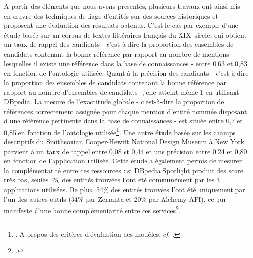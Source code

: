\documentclass[a4paper,12pt,twoside]{book}
\begin{document}
	A partir des éléments que nous avons présentés, plusieurs travaux ont ainsi mis en œuvre des techniques de liage d'entités sur des sources historiques et proposent une évaluation des résultats obtenus. C'est le cas par exemple d'une étude basée sur un corpus de textes littéraires français du XIX\ieme\ siècle, qui obtient un taux de rappel des candidats - c'est-à-dire la proportion des ensembles de candidats contenant la bonne référence par rapport au nombre de mentions lesquelles il existe une référence dans la base de connaissances - entre 0,63 et 0,83 en fonction de l'ontologie utilisée. Quant à la précision des candidats - c'est-à-dire la proportion des ensembles de candidats contenant la bonne référence par rapport au nombre d'ensembles de candidats -, elle atteint même 1 en utilisant DBpedia. La mesure de l'exactitude globale - c'est-à-dire la proportion de références correctement assignée pour chaque mention d'entité nommée disposant d'une référence pertinente dans la base de connaissances - est située entre 0,7 et 0,85 en fonction de l'ontologie utilisée\footnote{\cite{soudani_adaptation_2018}. A propos des critères d'évaluation des modèles, \textit{cf}. \cite{abadie_evaluation_2017}.}. Une autre étude basée sur les champs descriptifs du Smithsonian Cooper-Hewitt National Design Museum à New York parvient à un taux de rappel entre 0,08 et 0,44 et une précision entre 0,24 et 0,80 en fonction de l'application utilisée. Cette étude a également permis de mesurer la complémentarité entre ces ressources : si DBpedia Spotlight produit des score très bas, seules 4\% des entités trouvées l'ont été communément par les 3 applications utilisées. De plus, 54\% des entités trouvées l'ont été uniquement par l'un des autres outils (34\% par Zemanta et 20\% par Alchemy API), ce qui manifeste d'une bonne complémentarité entre ces services\footcite{van_hooland_exploring_2015}.
	
\end{document}
